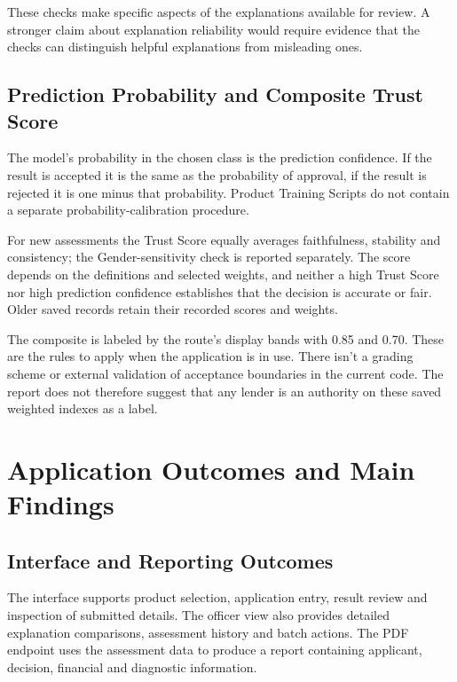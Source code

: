 These checks make specific aspects of the explanations available for review. A stronger claim about explanation reliability would require evidence that the checks can distinguish helpful explanations from misleading ones.

\subsection{Prediction Probability and Composite Trust Score}
The model's probability in the chosen class is the prediction confidence. If the result is accepted it is the same as the probability of approval, if the result is rejected it is one minus that probability. Product Training Scripts do not contain a separate probability-calibration procedure.

For new assessments the Trust Score equally averages faithfulness, stability and consistency; the Gender-sensitivity check is reported separately. The score depends on the definitions and selected weights, and neither a high Trust Score nor high prediction confidence establishes that the decision is accurate or fair. Older saved records retain their recorded scores and weights.

The composite is labeled by the route's display bands with 0.85 and 0.70. These are the rules to apply when the application is in use. There isn't a grading scheme or external validation of acceptance boundaries in the current code. The report does not therefore suggest that any lender is an authority on these saved weighted indexes as a label.

\section{Application Outcomes and Main Findings}
\subsection{Interface and Reporting Outcomes}
The interface supports product selection, application entry, result review and inspection of submitted details. The officer view also provides detailed explanation comparisons, assessment history and batch actions. The PDF endpoint uses the assessment data to produce a report containing applicant, decision, financial and diagnostic information.

